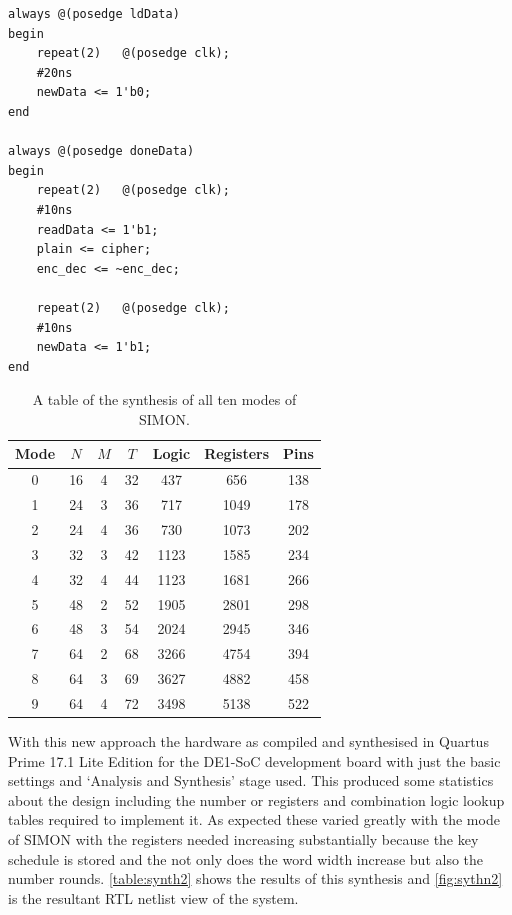 \documentclass[12pt,twoside,a4paper]{report}
\begin{document}
	\begin{minipage}{\linewidth}
	\begin{lstlisting}[label={lst:testbench},caption={The $always$ blocks of the testnches},style=SVStyle]
always @(posedge ldData)
begin
	repeat(2)	@(posedge clk);
	#20ns
	newData <= 1'b0;
end

always @(posedge doneData)
begin
	repeat(2)	@(posedge clk);
	#10ns
	readData <= 1'b1;
	plain <= cipher;
	enc_dec <= ~enc_dec;
	
	repeat(2)	@(posedge clk);
	#10ns
	newData <= 1'b1;
end
	\end{lstlisting}
	\end{minipage}

	\begin{table}[H]
	\centering
	\begin{tabular}{||c|c|c|c|c|c|c||}
		\hline \hline
		Mode  & $N$ & $M$ & $T$ & Logic & Registers & Pins\\
		\hline \hline
		0 & 16 & 4 & 32 & 437 &	656 &	138 \\
		\hline
		1 & 24 & 3 & 36 & 717	& 1049 & 178  \\
		2 & 24 & 4 & 36 & 730 &	1073 & 202  \\
		\hline
		3 & 32 & 3 & 42 & 1123 & 1585 &	234  \\
		4 & 32 & 4 & 44 & 1123 & 1681 &	266	\\
		\hline
		5 & 48 & 2 & 52 & 1905 & 2801 &	298  \\
		6 & 48 & 3 & 54 & 2024 & 2945 & 346 \\
		\hline
		7 & 64 & 2 & 68 & 3266 & 4754 & 394  \\
		8 & 64 & 3 & 69 & 3627 & 4882 & 458 \\
 		9 & 64 & 4 & 72 & 3498 & 5138 &	522 \\
		\hline \hline
	\end{tabular}
	\caption{A table of the synthesis of all ten modes of SIMON.}
	\label{table:synth2}
	\end{table}  
	
	With this new approach the hardware as compiled and synthesised in Quartus Prime 17.1 Lite Edition for the DE1-SoC development board with just the basic settings and `Analysis and Synthesis' stage used. This produced some statistics about the design including the number or registers and combination logic lookup tables required to implement it. As expected these varied greatly with the mode of SIMON with the registers needed increasing substantially because the key schedule is stored and the not only does the word width increase but also the number rounds. \autoref{table:synth2} shows the results of this synthesis and \autoref{fig:sythn2} is the resultant RTL netlist view of the system.
	    
\end{document}
